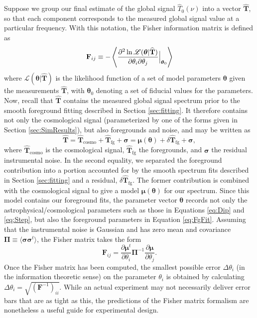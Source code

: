 \documentclass[twolcolumn,apj,iop,numberedappendix]{emulateapj}
\newcommand{\F}{\mathbf{F}}
\begin{document}
Suppose we group our final estimate of the global signal $\widehat{T}_0 (\nu)$ into a vector $\widehat{\mathbf{T}}$, so that each component corresponds to the measured global signal value at a particular frequency. With this notation, the Fisher information matrix is defined as
\begin{equation}
\F_{ij} \equiv -\left \langle \frac{\partial^2 \ln \mathscr{L}(\boldsymbol \theta | \widehat{\mathbf{T}})}{\partial \theta_i \partial \theta_j} \Big{|}_{\boldsymbol \theta_0} \right \rangle
\end{equation}
where $\mathscr{L}(\boldsymbol \theta | \widehat{\mathbf{T}})$ is the likelihood function of a set of model parameters $\boldsymbol \theta$ given the measurements $\widehat{\mathbf{T}}$, with $\boldsymbol \theta_0$ denoting a set of fiducial values for the parameters. Now, recall that $\widehat{\mathbf{T}}$ contains the measured global signal spectrum prior to the smooth foreground fitting described in Section \ref{sec:fitting}. It therefore contains not only the cosmological signal (parameterized by one of the forms given in Section \ref{sec:SimResults}), but also foregrounds and noise, and may be written as
\begin{equation}
\widehat{\mathbf{T}}= \widehat{\mathbf{T}} _\textrm{cosmo} + \widehat{\mathbf{T}}_\textrm{fg} + \boldsymbol \sigma = \boldsymbol \mu (\boldsymbol \theta) +\delta \widehat{\mathbf{T}}_\textrm{fg} + \boldsymbol \sigma,
\end{equation}
where $\widehat{\mathbf{T}} _\textrm{cosmo}$ is the cosmological signal, $\widehat{\mathbf{T}}_\textrm{fg}$ the foregrounds, and $\boldsymbol \sigma$ the residual instrumental noise. In the second equality, we separated the foreground contribution into a portion accounted for by the smooth spectrum fits described in Section \ref{sec:fitting} and a residual, $\delta \widehat{\mathbf{T}}_\textrm{fg}$. The former contribution is combined with the cosmological signal to give a model $\boldsymbol \mu (\boldsymbol \theta)$ for our spectrum. Since this model contains our foreground fits, the parameter vector $\boldsymbol \theta$ records not only the astrophysical/cosmological parameters such as those in Equations \eqref{eq:Dip} and \eqref{eq:Step}, but also the foreground parameters in Equation \eqref{eq:FgFit}. Assuming that the instrumental noise is Gaussian and has zero mean and covariance $\boldsymbol \Pi \equiv \langle \boldsymbol \sigma \boldsymbol \sigma^t \rangle$, the Fisher matrix takes the form
\begin{equation}
\F_{ij} = \frac{\partial \boldsymbol \mu ^t}{\partial \theta_i} \boldsymbol \Pi ^{-1} \frac{\partial \boldsymbol \mu}{\partial \theta_j}.
\end{equation}
Once the Fisher matrix has been computed, the smallest possible error $\Delta \theta_i$ (in the information theoretic sense) on the parameter $\theta_i$ is obtained by calculating $\Delta \theta_i = \sqrt{(\F^{-1})_{ii}}$. While an actual experiment may not necessarily deliver error bars that are as tight as this, the predictions of the Fisher matrix formalism are nonetheless a useful guide for experimental design.
\end{document}
